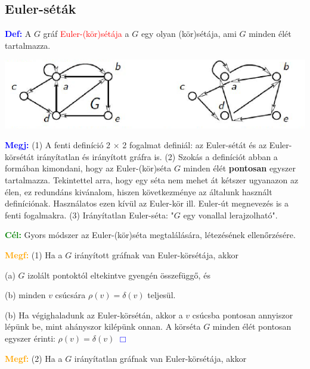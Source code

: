 \documentclass[../szamtud.tex]{subfiles}
\begin{document}
    \subsection{Euler-séták}

        \textcolor{blue}{\textbf{Def:}} A $G$ gráf \textcolor{red}{Euler-(kör)sétája} a $G$ egy olyan (kör)sétája, ami $G$ minden élét tartalmazza.

        \includegraphics[width=\textwidth]{img/1.png}

        \textcolor{blue}{\textbf{Megj:}} (1) A fenti definíció 2 $\times$ 2 fogalmat definiál: az Euler-sétát és az Euler-körsétát irányítatlan és irányított gráfra is. (2) Szokás a definíciót abban a formában kimondani, hogy az Euler-(kör)séta $G$ minden élét \textbf{pontosan} egyszer tartalmazza. Tekintettel arra, hogy egy séta nem mehet át kétszer ugyanazon az élen, ez redundáns kivánalom, hiszen következménye az általunk használt definíciónak. Használatos ezen kívül az Euler-kör ill. Euler-út megnevezés is a fenti fogalmakra. (3) Irányítatlan Euler-séta: "$G$ egy vonallal lerajzolható".

        \textcolor{green}{\textbf{Cél:}} Gyors módszer az Euler-(kör)séta megtalálására, létezésének ellenőrzésére.

        \textcolor{orange}{\textbf{Megf:}} (1) Ha a $G$ irányított gráfnak van Euler-körsétája, akkor 

            (a) $G$ izolált pontoktól eltekintve gyengén összefüggő, és 

            (b) minden $v$ csúcsára $\rho(v) = \delta(v)$ teljesül.


        (b) Ha végighaladunk az Euler-körsétán, akkor a $v$ csúcsba pontosan annyiszor lépünk be, mint ahányszor kilépünk onnan. A körséta $G$ minden élét pontosan egyszer érinti: $\rho(v) = \delta(v)$  \textcolor{blue}{$\Box$} 

        \textcolor{orange}{\textbf{Megf:}} (2) Ha a $G$ irányítatlan gráfnak van Euler-körsétája, akkor 
\end{document}
